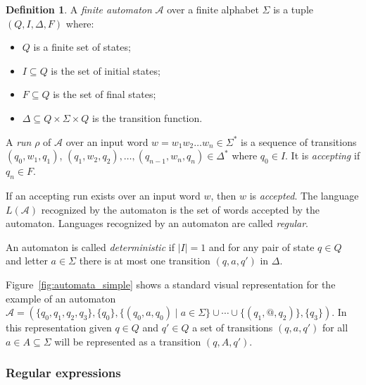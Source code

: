 \documentclass[12px]{article}
\theoremstyle{definition}
\newtheorem{definition}{Definition}
\begin{document}
      \begin{definition}
        A \emph{finite automaton} $\mathcal{A}$ over a finite alphabet $\Sigma$ is a
        tuple $(Q, I, \Delta, F)$ where:
          \begin{itemize}
            \item $Q$ is a finite set of states;
            \item $I \subseteq Q$ is the set of initial states;
            \item $F \subseteq Q$ is the set of final states;
            \item $\Delta \subseteq Q \times \Sigma \times Q$ is the transition
              function.
          \end{itemize}

          A \textit{run} $\rho$ of $\mathcal{A}$ over an input word $w= w_1 w_2
          \ldots w_n \in \Sigma^*$ is a sequence of transitions $(q_0, w_1,
          q_1)$, $(q_1, w_2, q_2), \ldots, (q_{n-1}, w_n, q_n) \in \Delta^*$
          where $q_0 \in I$. It is \textit{accepting} if $q_n \in F$.

          If an accepting run exists over an input word $w$, then $w$ is
          \textit{accepted}. The language $L(\mathcal{A})$ recognized by the
          automaton is the set of words accepted by the automaton. Languages
          recognized by an automaton are called \textit{regular}.

          An automaton is called \textit{deterministic} if $|I| = 1$ and for
          any pair of state $q \in Q$ and letter $a \in \Sigma$ there is at
          most one transition $(q, a, q')$ in $\Delta$.
        \end{definition}

        Figure~\ref{fig:automata_simple} shows a standard visual representation
        for the example of an automaton $\mathcal{A} = (\{q_0, q_1, q_2, q_3\},
        \{q_0\}, \{(q_0, a, q_0)\mid a \in \Sigma\} \cup \cdots \cup \{(q_1,
        \texttt{@}, q_2)\},\{q_3\})$. In this representation given $q \in Q$
        and $q' \in Q$ a set of transitions $(q, a, q')$ for all $a \in A
        \subseteq \Sigma$ will be represented as a transition $(q, A, q')$.

      \subsubsection{Regular expressions}%
        \label{sec:def:regex}
\end{document}
